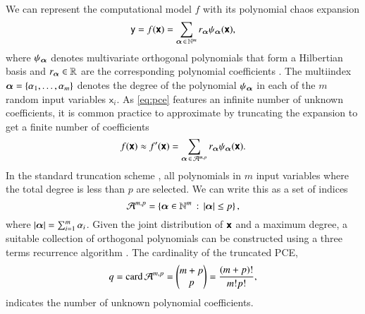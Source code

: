 We can represent the computational model $f$ with its polynomial chaos expansion
\begin{equation}
    \mathsf{y} = f(\boldsymbol{\mathsf{x}}) = \sum_{{\bm{\alpha}} \,\in\, \mathbb{N}^m} r_{{\bm{\alpha}}} \psi_{{\bm{\alpha}}}(\boldsymbol{\mathsf{x}}),
    \label{eq:pce}
\end{equation}
where $\psi_{\bm{\alpha}}$ denotes multivariate orthogonal polynomials that form
a Hilbertian basis and $r_{\bm{\alpha}} \in \mathbb{R}$ are the corresponding polynomial coefficients \cite{sudret_global_2008}. The multiindex ${\bm{\alpha}} = \{\alpha_1,\dots,\alpha_m\}$
denotes the degree of the polynomial $\psi_{\bm{\alpha}}$ in each of the $m$ random input variables $\mathsf{x}_i$.
As \cref{eq:pce} features an infinite number of unknown coefficients,
it is common practice to approximate by truncating the expansion to get a finite number of coefficients
\begin{equation}
    f(\boldsymbol{\mathsf{x}}) \approx f'(\boldsymbol{\mathsf{x}}) = \sum_{{\bm{\alpha}} \,\in\, \mathcal{A}^{m,p}} r_{\bm{\alpha}} \psi_{\bm{\alpha}}(\boldsymbol{\mathsf{x}}).
\end{equation}
In the standard truncation scheme \cite{gratiet_metamodel-based_2015,sudret_global_2008},
all polynomials in $m$ input variables where the total degree is less than $p$ are selected.
We can write this as a set of indices
\begin{equation}
    \mathcal{A}^{m,p} = \left\{{\bm{\alpha}} \in \mathbb{N}^m \,:\, \left|{\bm{\alpha}}\right| \leq p\right\},
\end{equation}
where $\left|{\bm{\alpha}}\right| = \sum_{i=1}^m \alpha_i$.
Given the joint distribution of $\boldsymbol{\mathsf{x}}$ and a maximum degree,
a suitable collection of orthogonal polynomials can be constructed
using a three terms recurrence algorithm \cite{feinberg_chaospy_2015}.
The cardinality of the truncated PCE,
\begin{equation}
    q = \text{card}\, \mathcal{A}^{m,p} = \left(\begin{matrix}
        m+p \\
        p
    \end{matrix}\right) = \frac{(m+p)!}{m!p!},
    \label{eq:cardinality}
\end{equation}
indicates the number of unknown polynomial coefficients.

